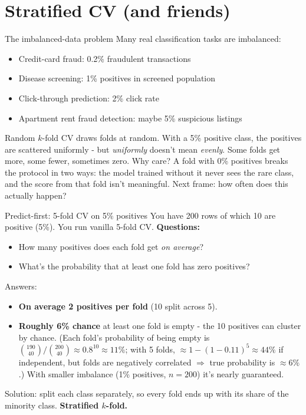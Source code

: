 \documentclass[aspectratio=169]{beamer}
\begin{document}
\section{Stratified CV (and friends)}

\begin{frame}{The imbalanced-data problem}
  Many real classification tasks are imbalanced:
  \begin{itemize}
    \item Credit-card fraud: 0.2\% fraudulent transactions
    \item Disease screening: 1\% positives in screened population
    \item Click-through prediction: 2\% click rate
    \item Apartment rent fraud detection: maybe 5\% suspicious listings
  \end{itemize}
  \vfill
  Random $k$-fold CV draws folds at random. With a 5\% positive class, the positives are scattered uniformly - but \emph{uniformly} doesn't mean \emph{evenly}. Some folds get more, some fewer, sometimes zero.
  \vfill
  Why care? A fold with 0\% positives breaks the protocol in two ways: the model trained without it never sees the rare class, and the score from that fold isn't meaningful.
  \vfill
  Next frame: how often does this actually happen?
\end{frame}

\begin{frame}{Predict-first: 5-fold CV on 5\% positives}
  You have 200 rows of which 10 are positive (5\%). You run vanilla 5-fold CV.
  \vfill
  \textbf{Questions:}
  \begin{itemize}
    \item How many positives does each fold get \emph{on average}?
    \item What's the probability that at least one fold has zero positives?
  \end{itemize}
  \vfill
  Answers:
  \begin{itemize}
    \item \textbf{On average 2 positives per fold} (10 split across 5).
    \item \textbf{Roughly 6\% chance} at least one fold is empty - the 10 positives can cluster by chance. (Each fold's probability of being empty is $\binom{190}{40}/\binom{200}{40} \approx 0.8^{10} \approx 11\%$; with 5 folds, $\approx 1 - (1 - 0.11)^5 \approx 44\%$ if independent, but folds are negatively correlated $\Rightarrow$ true probability is $\approx 6\%$.) With smaller imbalance (1\% positives, $n=200$) it's nearly guaranteed.
  \end{itemize}
  \vfill
  Solution: split each class separately, so every fold ends up with its share of the minority class. \textbf{Stratified $k$-fold.}
\end{frame}
\end{document}

